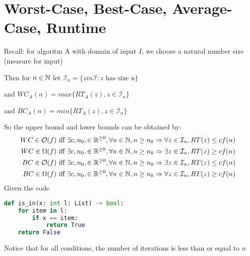 \documentclass[12pt, letterpaper, twoside]{article}
\begin{document}

\section{Worst-Case, Best-Case, Average-Case, Runtime}

Recall: for algoritm A with domain of input $I$, we choose a natural number size (measure for input)

Then for $n \in \mathbb N$ let $\mathcal{I}_n = \{z in \mathcal{I}: z\text{ has size n}\}$

and $WC_A(n) = max \{RT_A(z), z \in \mathcal{I}_n\}$

and $BC_A(n) = min \{RT_A(z), z \in \mathcal{I}_n\}$

So the upper bound and lower bounds can be obtained by:
\begin{align*}
    WC \in \mathcal O(f) \text{ iff } \exists c, n_0, \in \mathbb R^{\ge 0}, \forall n \in \mathbb N, n \ge n_0 &\mathrel{\Rightarrow} \forall z \in \mathcal{I}_n, RT(z) \le c f(n)\\
    WC \in \Omega(f) \text{ iff } \exists c, n_0, \in \mathbb R^{\ge 0}, \forall n \in \mathbb N, n \ge n_0 &\mathrel{\Rightarrow} \exists z \in \mathcal{I}_n, RT(z) \ge c f(n)\\
    BC \in \mathcal O(f) \text{ iff } \exists c, n_0, \in \mathbb R^{\ge 0}, \forall n \in \mathbb N, n \ge n_0 &\mathrel{\Rightarrow} \exists z \in \mathcal{I}_n, RT(z) \le c f(n)\\
    BC \in \Omega(f) \text{ iff } \exists c, n_0, \in \mathbb R^{\ge 0}, \forall n \in \mathbb N, n \ge n_0 &\mathrel{\Rightarrow} \forall z \in \mathcal{I}_n, RT(z) \ge c f(n)
\end{align*}
Given the code 
\begin{lstlisting}[language=Python]
def is_in(x: int l: List) -> bool:
    for item in l:
        if x == item:
            return True
    return False
\end{lstlisting}

Notice that for all conditions, the number of iterations is less than or equal to $n$
\end{document}
